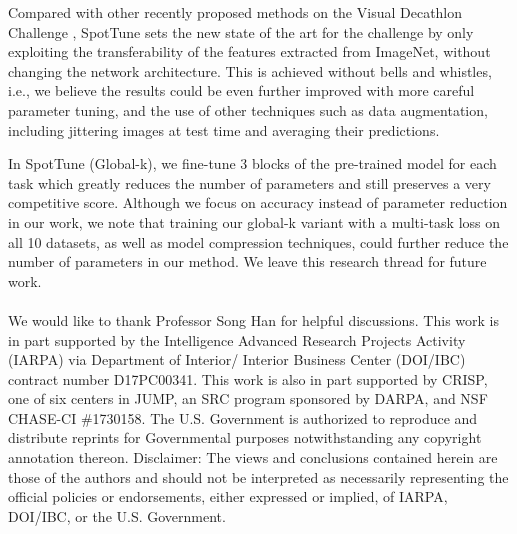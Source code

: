 \documentclass[10pt,twocolumn,letterpaper]{article}
\begin{document}
 Compared with other recently proposed methods on the Visual Decathlon Challenge \cite{mallya2018piggyback,rosenfeld2017incremental,rebuffi2017learning,rebuffi2018efficient,li2017learning}, SpotTune sets the new state of the art for the challenge by only exploiting the transferability of the features extracted from ImageNet, without changing the network architecture. This is achieved without bells and whistles, i.e., we believe the results could be even further improved with more careful parameter tuning, and the use of other techniques such as data augmentation, including jittering images at test time and averaging their predictions.
 
 In SpotTune (Global-k), we fine-tune 3 blocks of the pre-trained model for each task which greatly reduces the number of parameters and still preserves a very competitive score.  Although we focus on accuracy instead of parameter reduction in our work, we note that training our global-k variant with a multi-task loss on all 10 datasets, as well as model compression techniques, could further reduce the number of parameters in our method. We leave this research thread for future work.
\\
\\
We would like to thank Professor Song Han for helpful discussions. This work is in part supported by the Intelligence Advanced Research Projects Activity (IARPA) via Department of Interior/ Interior Business Center (DOI/IBC) contract number D17PC00341. This work is also in part supported  by CRISP, one of six centers in JUMP, an SRC program sponsored by DARPA, and NSF CHASE-CI \#1730158. The U.S. Government is authorized to reproduce and distribute reprints for Governmental purposes notwithstanding any copyright annotation thereon. Disclaimer: The views and conclusions contained herein are those of the authors and should not be interpreted as necessarily representing the official policies or endorsements, either expressed or implied, of IARPA, DOI/IBC, or the U.S. Government.
\end{document}
